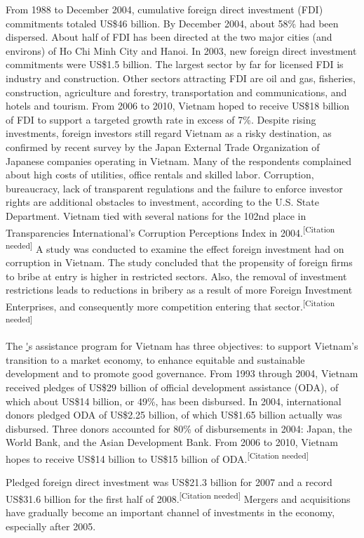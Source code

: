 \documentclass[openany]{book}
\begin{document}
From 1988 to December 2004, cumulative foreign direct investment (FDI) commitments totaled US\$46 billion. By December 2004, about 58\% had been dispersed. About half of FDI has been directed at the two major cities (and environs) of Ho Chi Minh City and Hanoi. In 2003, new foreign direct investment commitments were US\$1.5 billion. The largest sector by far for licensed FDI is industry and construction. Other sectors attracting FDI are oil and gas, fisheries, construction, agriculture and forestry, transportation and communications, and hotels and tourism. From 2006 to 2010, Vietnam hoped to receive US\$18 billion of FDI to support a targeted growth rate in excess of 7\%. Despite rising investments, foreign investors still regard Vietnam as a risky destination, as confirmed by recent survey by the Japan External Trade Organization of Japanese companies operating in Vietnam. Many of the respondents complained about high costs of utilities, office rentals and skilled labor. Corruption, bureaucracy, lack of transparent regulations and the failure to enforce investor rights are additional obstacles to investment, according to the U.S. State Department. Vietnam tied with several nations for the 102nd place in Transparencies International's Corruption Perceptions Index in 2004.\textsuperscript{[Citation needed]} A study was conducted to examine the effect foreign investment had on corruption in Vietnam. The study concluded that the propensity of foreign firms to bribe at entry is higher in restricted sectors. Also, the removal of investment restrictions leads to reductions in bribery as a result of more Foreign Investment Enterprises, and consequently more competition entering that sector.\textsuperscript{[Citation needed]}

The \href{World Bank}'s assistance program for Vietnam has three objectives: to support Vietnam's transition to a market economy, to enhance equitable and sustainable development and to promote good governance. From 1993 through 2004, Vietnam received pledges of US\$29 billion of official development assistance (ODA), of which about US\$14 billion, or 49\%, has been disbursed. In 2004, international donors pledged ODA of US\$2.25 billion, of which US\$1.65 billion actually was disbursed. Three donors accounted for 80\% of disbursements in 2004: Japan, the World Bank, and the Asian Development Bank. From 2006 to 2010, Vietnam hopes to receive US\$14 billion to US\$15 billion of ODA.\textsuperscript{[Citation needed]}

Pledged foreign direct investment was US\$21.3 billion for 2007 and a record US\$31.6 billion for the first half of 2008.\textsuperscript{[Citation needed]} Mergers and acquisitions have gradually become an important channel of investments in the economy, especially after 2005.
\end{document}
